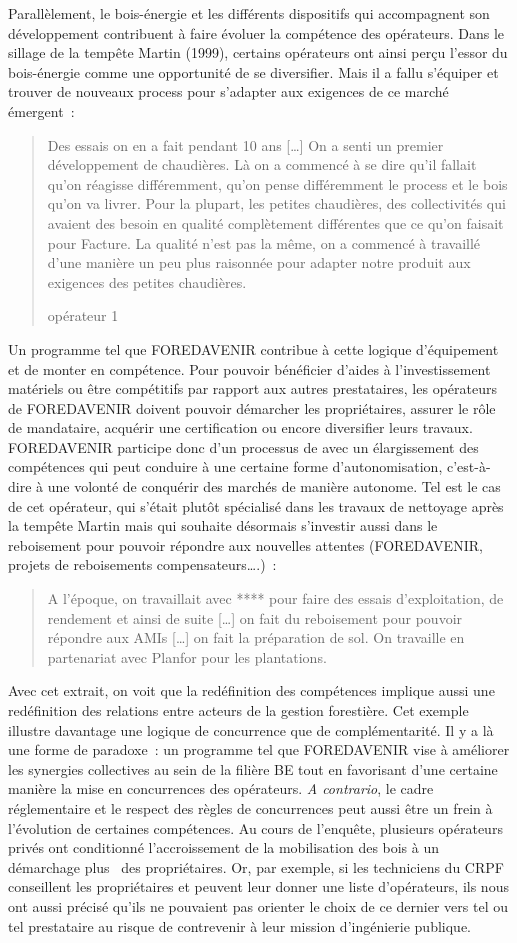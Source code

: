 \documentclass[12pt]{report}
\begin{document}
Parallèlement, le bois-énergie et les différents dispositifs qui accompagnent
son développement contribuent à faire évoluer la compétence des opérateurs.
Dans le sillage de la tempête Martin (1999), certains opérateurs ont ainsi perçu
l’essor du bois-énergie comme une opportunité de se diversifier. Mais il a fallu
s’équiper et trouver de nouveaux process pour s’adapter aux exigences de ce
marché émergent~: 
\blockquote[opérateur 1]{Des essais on en a fait
  pendant 10 ans [\dots] On a senti un premier développement de chaudières. Là
  on a commencé à se dire qu’il fallait qu’on réagisse différemment, qu’on pense
  différemment le process et le bois qu’on va livrer. Pour la plupart, les
  petites chaudières, des collectivités qui avaient des besoin en qualité
  complètement différentes que ce qu’on faisait pour Facture. La qualité n’est
  pas la même, on a commencé à travaillé d’une manière un peu plus raisonnée
  pour adapter notre produit aux exigences des petites chaudières.}


Un programme tel que FOREDAVENIR contribue à cette logique d’équipement et de
monter en compétence. Pour pouvoir bénéficier d’aides à l’investissement matériels
ou être compétitifs par rapport aux autres prestataires, les opérateurs de
FOREDAVENIR doivent pouvoir démarcher les propriétaires, assurer le rôle de mandataire,
acquérir une certification ou encore diversifier leurs travaux. FOREDAVENIR
participe donc d’un processus de 
avec un élargissement des compétences qui peut conduire à une certaine forme
d’autonomisation, c’est-à-dire à une volonté de conquérir des marchés de manière
autonome. Tel est le cas de cet opérateur, qui s’était plutôt spécialisé dans
les travaux de nettoyage après la tempête Martin mais qui souhaite désormais
s’investir aussi dans le reboisement pour pouvoir répondre aux nouvelles attentes
(FOREDAVENIR, projets de reboisements compensateurs….)~:
\blockquote{A l’époque, on travaillait avec **** pour faire des essais d’exploitation, de
rendement et ainsi de suite [\ldots] on fait du reboisement pour pouvoir répondre
aux AMIs [\ldots] on fait la préparation de sol. On travaille en partenariat avec
Planfor pour les plantations.}


Avec cet extrait, on voit que la redéfinition des compétences implique aussi
une redéfinition des relations entre acteurs de la gestion forestière. Cet
exemple illustre davantage
une logique de concurrence que de complémentarité. Il y a là une forme de
paradoxe~: un programme tel que FOREDAVENIR vise à améliorer les synergies
collectives au sein de la filière BE tout en favorisant d’une certaine manière
la mise en concurrences des opérateurs. \textit{A contrario}, le cadre réglementaire et
le respect des règles de concurrences peut aussi être un frein à l’évolution de
certaines compétences. Au cours de l’enquête, plusieurs opérateurs privés ont
conditionné l’accroissement de la mobilisation des bois à un démarchage plus
 des propriétaires. Or, par exemple, si les techniciens du CRPF
conseillent les propriétaires et peuvent leur donner une liste d’opérateurs,
ils nous ont aussi précisé qu’ils ne pouvaient pas orienter le choix de ce
dernier vers tel ou tel prestataire au risque de contrevenir à leur mission
d’ingénierie publique.
\end{document}
